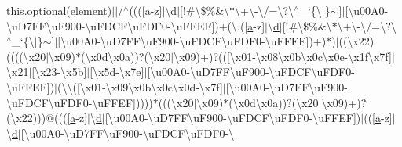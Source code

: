 \begin{DoxyCompactItemize}
this.\+optional(element)$\vert$$\vert$/$^\wedge$(((\mbox{[}\hyperlink{jquery_8unobtrusive-ajax_8min_8js_a9cf3d65797f4cbe9deaab01492290370}{a}-\/z\mbox{]}$\vert$\textbackslash{}\hyperlink{_scripts_2respond_8min_8js_aeb337d295abaddb5ec3cb34cc2e2bbc9}{d}$\vert$\mbox{[}!\#\textbackslash{}\$\%\&\textquotesingle{}\textbackslash{}$\ast$\textbackslash{}+\textbackslash{}-\/\textbackslash{}/=\textbackslash{}?\textbackslash{}$^\wedge$\+\_\+`\{\textbackslash{}$\vert$\}$\sim$\mbox{]}$\vert$\mbox{[}\textbackslash{}u00\+A0-\/\textbackslash{}u\+D7\+F\+F\textbackslash{}u\+F900-\/\textbackslash{}u\+F\+D\+C\+F\textbackslash{}u\+F\+D\+F0-\/\textbackslash{}u\+F\+F\+E\+F\mbox{]})+(\textbackslash{}.(\mbox{[}\hyperlink{jquery_8unobtrusive-ajax_8min_8js_a9cf3d65797f4cbe9deaab01492290370}{a}-\/z\mbox{]}$\vert$\textbackslash{}\hyperlink{_scripts_2respond_8min_8js_aeb337d295abaddb5ec3cb34cc2e2bbc9}{d}$\vert$\mbox{[}!\#\textbackslash{}\$\%\&\textquotesingle{}\textbackslash{}$\ast$\textbackslash{}+\textbackslash{}-\/\textbackslash{}/=\textbackslash{}?\textbackslash{}$^\wedge$\+\_\+`\{\textbackslash{}$\vert$\}$\sim$\mbox{]}$\vert$\mbox{[}\textbackslash{}u00\+A0-\/\textbackslash{}u\+D7\+F\+F\textbackslash{}u\+F900-\/\textbackslash{}u\+F\+D\+C\+F\textbackslash{}u\+F\+D\+F0-\/\textbackslash{}u\+F\+F\+E\+F\mbox{]})+)$\ast$)$\vert$((\textbackslash{}x22)((((\textbackslash{}x20$\vert$\textbackslash{}x09)$\ast$(\textbackslash{}x0d\textbackslash{}x0a))?(\textbackslash{}x20$\vert$\textbackslash{}x09)+)?((\mbox{[}\textbackslash{}x01-\/\textbackslash{}x08\textbackslash{}x0b\textbackslash{}x0c\textbackslash{}x0e-\/\textbackslash{}x1f\textbackslash{}x7f\mbox{]}$\vert$\textbackslash{}x21$\vert$\mbox{[}\textbackslash{}x23-\/\textbackslash{}x5b\mbox{]}$\vert$\mbox{[}\textbackslash{}x5d-\/\textbackslash{}x7e\mbox{]}$\vert$\mbox{[}\textbackslash{}u00\+A0-\/\textbackslash{}u\+D7\+F\+F\textbackslash{}u\+F900-\/\textbackslash{}u\+F\+D\+C\+F\textbackslash{}u\+F\+D\+F0-\/\textbackslash{}u\+F\+F\+E\+F\mbox{]})$\vert$(\textbackslash{}\textbackslash{}(\mbox{[}\textbackslash{}x01-\/\textbackslash{}x09\textbackslash{}x0b\textbackslash{}x0c\textbackslash{}x0d-\/\textbackslash{}x7f\mbox{]}$\vert$\mbox{[}\textbackslash{}u00\+A0-\/\textbackslash{}u\+D7\+F\+F\textbackslash{}u\+F900-\/\textbackslash{}u\+F\+D\+C\+F\textbackslash{}u\+F\+D\+F0-\/\textbackslash{}u\+F\+F\+E\+F\mbox{]}))))$\ast$(((\textbackslash{}x20$\vert$\textbackslash{}x09)$\ast$(\textbackslash{}x0d\textbackslash{}x0a))?(\textbackslash{}x20$\vert$\textbackslash{}x09)+)?(\textbackslash{}x22)))@(((\mbox{[}\hyperlink{jquery_8unobtrusive-ajax_8min_8js_a9cf3d65797f4cbe9deaab01492290370}{a}-\/z\mbox{]}$\vert$\textbackslash{}\hyperlink{_scripts_2respond_8min_8js_aeb337d295abaddb5ec3cb34cc2e2bbc9}{d}$\vert$\mbox{[}\textbackslash{}u00\+A0-\/\textbackslash{}u\+D7\+F\+F\textbackslash{}u\+F900-\/\textbackslash{}u\+F\+D\+C\+F\textbackslash{}u\+F\+D\+F0-\/\textbackslash{}u\+F\+F\+E\+F\mbox{]})$\vert$((\mbox{[}\hyperlink{jquery_8unobtrusive-ajax_8min_8js_a9cf3d65797f4cbe9deaab01492290370}{a}-\/z\mbox{]}$\vert$\textbackslash{}\hyperlink{_scripts_2respond_8min_8js_aeb337d295abaddb5ec3cb34cc2e2bbc9}{d}$\vert$\mbox{[}\textbackslash{}u00\+A0-\/\textbackslash{}u\+D7\+F\+F\textbackslash{}u\+F900-\/\textbackslash{}u\+F\+D\+C\+F\textbackslash{}u\+F\+D\+F0-\/\textbackslash{}
\end{DoxyCompactItemize}
